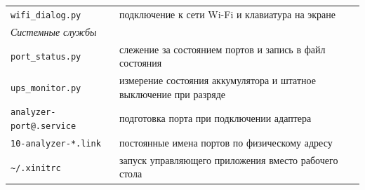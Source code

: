 \begin{table}[htbp]
\begin{tabular}{lp{9.5cm}}
        \texttt{wifi\_dialog.py} & подключение к сети Wi-Fi и клавиатура на экране \\
        \multicolumn{2}{l}{\textit{Системные службы}} \\
        \texttt{port\_status.py} & слежение за состоянием портов и запись в файл состояния \\
        \texttt{ups\_monitor.py} & измерение состояния аккумулятора и штатное выключение при разряде \\
        \texttt{analyzer-port@.service} & подготовка порта при подключении адаптера \\
        \texttt{10-analyzer-*.link} & постоянные имена портов по физическому адресу \\
        \texttt{\textasciitilde/.xinitrc} & запуск управляющего приложения вместо рабочего стола \\
        \hline
    \end{tabular}
\end{table}
